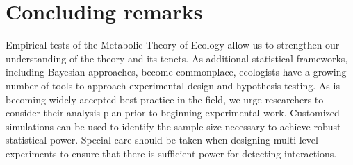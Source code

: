 \documentclass[a4paper,12pt]{article}
\begin{document}
\section{Concluding remarks}
Empirical tests of the Metabolic Theory of Ecology allow us to strengthen our understanding of the theory and its tenets. As additional statistical frameworks, including Bayesian approaches, become commonplace, ecologists have a growing number of tools to approach experimental design and hypothesis testing. As is becoming widely accepted best-practice in the field, we urge researchers to consider their analysis plan prior to beginning experimental work. Customized simulations can be used to identify the sample size necessary to achieve robust statistical power. Special care should be taken when designing multi-level experiments to ensure that there is sufficient power for detecting interactions.



\end{document}

